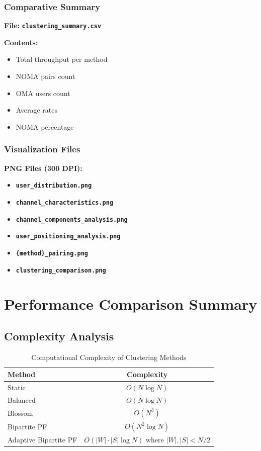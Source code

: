 \documentclass[12pt,a4paper]{article}
\newcommand{\file}[1]{\texttt{\textbf{#1}}}
\begin{document}
\subsubsection{Comparative Summary}

\textbf{File:} \file{clustering\_summary.csv}

\textbf{Contents:}
\begin{itemize}
    \item Total throughput per method
    \item NOMA pairs count
    \item OMA users count
    \item Average rates
    \item NOMA percentage
\end{itemize}

\subsubsection{Visualization Files}

\textbf{PNG Files (300 DPI):}
\begin{itemize}
    \item \file{user\_distribution.png}
    \item \file{channel\_characteristics.png}
    \item \file{channel\_components\_analysis.png}
    \item \file{user\_positioning\_analysis.png}
    \item \file{\{method\}\_pairing.png}
    \item \file{clustering\_comparison.png}
\end{itemize}

\section{Performance Comparison Summary}

\subsection{Complexity Analysis}

\begin{table}[h]
\centering
\caption{Computational Complexity of Clustering Methods}
\begin{tabular}{lc}
\toprule
\textbf{Method} & \textbf{Complexity} \\
\midrule
Static & $O(N \log N)$ \\
Balanced & $O(N \log N)$ \\
Blossom & $O(N^3)$ \\
Bipartite PF & $O(N^2 \log N)$ \\
Adaptive Bipartite PF & $O(|W| \cdot |S| \log N)$ where $|W|, |S| < N/2$ \\
\bottomrule
\end{tabular}
\end{table}
\end{document}
